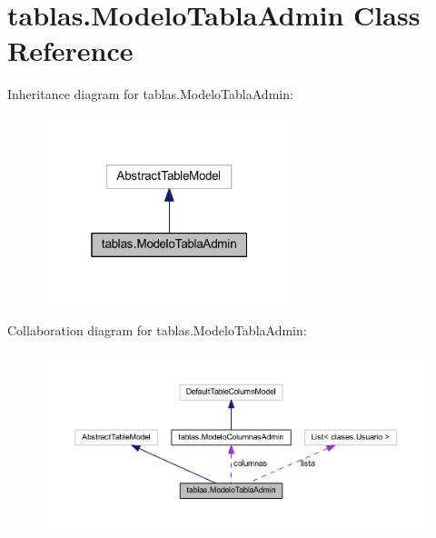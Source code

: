 \hypertarget{classtablas_1_1_modelo_tabla_admin}{}\section{tablas.\+Modelo\+Tabla\+Admin Class Reference}
\label{classtablas_1_1_modelo_tabla_admin}


Inheritance diagram for tablas.\+Modelo\+Tabla\+Admin\+:
\nopagebreak
\begin{figure}[H]
\begin{center}
\leavevmode
\includegraphics[width=208pt]{classtablas_1_1_modelo_tabla_admin__inherit__graph}
\end{center}
\end{figure}


Collaboration diagram for tablas.\+Modelo\+Tabla\+Admin\+:
\nopagebreak
\begin{figure}[H]
\begin{center}
\leavevmode
\includegraphics[width=350pt]{classtablas_1_1_modelo_tabla_admin__coll__graph}
\end{center}
\end{figure}
